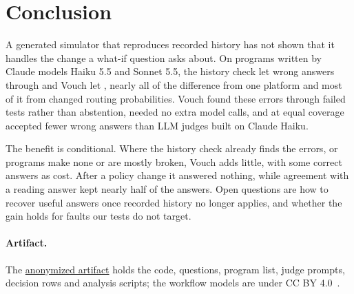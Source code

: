\section{Conclusion}
\label{sec:conclusion}

A generated simulator that reproduces recorded history has not shown that it handles the change a what-if question asks about. On programs written by Claude models Haiku 5.5 and Sonnet 5.5, the history check let \rHistWrongClaude{} wrong answers through and Vouch let \rGateWrongClaude, nearly all of the difference from one platform and most of it from changed routing probabilities. Vouch found these errors through failed tests rather than abstention, needed no extra model calls, and at equal coverage accepted fewer wrong answers than LLM judges built on Claude Haiku.

The benefit is conditional. Where the history check already finds the errors, or programs make none or are mostly broken, Vouch adds little, with some correct answers as cost. After a policy change it answered nothing, while agreement with a reading answer kept nearly half of the answers. Open questions are how to recover useful answers once recorded history no longer applies, and whether the gain holds for faults our tests do not target.

\paragraph{Artifact.} The \href{https://anonymous.4open.science/r/vouch_artifact-6893}{\textcolor{ACMDarkBlue}{anonymized artifact}} holds the code, questions, program list, judge prompts, decision rows and analysis scripts; the workflow models are under CC BY 4.0~\cite{chapela2023zenodo}.
